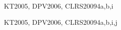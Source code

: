 \begin{syllabus}
\begin{unit}{\ALDistributedAlgorithmsDef}{KT2005, DPV2006, CLRS2009}{4}{a,b,i}
   \ALDistributedAlgorithmsAllTopics
   \ALDistributedAlgorithmsAllObjectives
\end{unit}

\begin{unit}{\ALPversusNPDef}{KT2005, DPV2006, CLRS2009}{4}{a,b,i,j}
   \ALPversusNPAllTopics
   \ALPversusNPAllObjectives
\end{unit}



\begin{coursebibliography}
\end{coursebibliography}

\end{syllabus}
